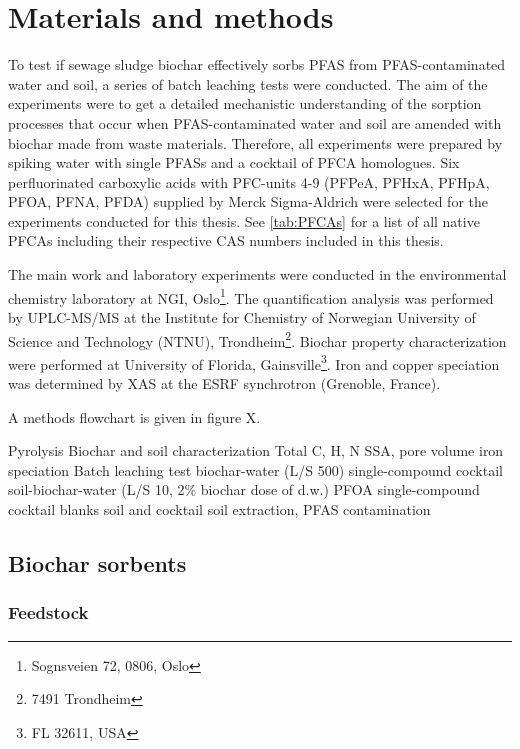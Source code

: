 \chapter{Materials and methods}\label{chap:MatlsMethds}
To test if sewage sludge biochar effectively sorbs PFAS from PFAS-contaminated water and soil, a series of batch leaching tests were conducted. The aim of the experiments were to get a detailed mechanistic understanding of the sorption processes that occur when PFAS-contaminated water and soil are amended with biochar made from waste materials. Therefore, all experiments were prepared by spiking water with single PFASs and a cocktail of PFCA homologues. Six perfluorinated carboxylic acids with PFC-units 4-9 (PFPeA, PFHxA, PFHpA, PFOA, PFNA, PFDA) supplied by Merck Sigma-Aldrich were selected for the experiments conducted for this thesis. See \cref{tab:PFCAs} for a list of all native PFCAs including their respective CAS numbers included in this thesis. 

The main work and laboratory experiments were conducted in the environmental chemistry laboratory at NGI, Oslo\footnote{Sognsveien 72, 0806, Oslo}. The quantification analysis was performed by UPLC-MS/MS at the Institute for Chemistry of Norwegian University of Science and Technology (NTNU), Trondheim\footnote{7491 Trondheim}. Biochar property characterization were performed at University of Florida, Gainsville\footnote{FL 32611, USA}. Iron and copper speciation was determined by XAS at the ESRF synchrotron (Grenoble, France). 

A methods flowchart is given in figure X. 

Pyrolysis
Biochar and soil characterization
Total C, H, N
	SSA, pore volume
	iron speciation
 Batch leaching test
	biochar-water (L/S 500)
 		single-compound
		cocktail
 	soil-biochar-water (L/S 10, 2\% biochar dose of d.w.)
		PFOA single-compound
	cocktail
	blanks
		soil and cocktail
		soil extraction, PFAS contamination



\section{Biochar sorbents}

\subsection{Feedstock}

